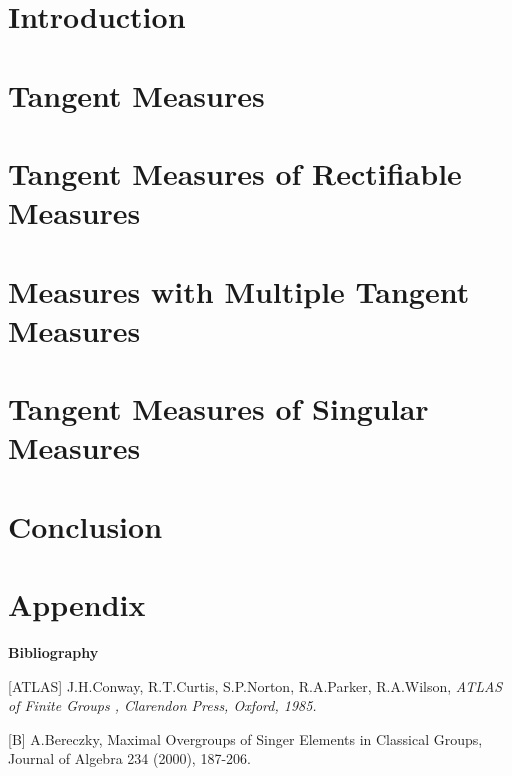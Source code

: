 \documentclass[11pt,a4paper,twoside]{article}
\begin{document}
 

\setcounter{page}{2}

\onehalfspacing
{}
\onehalfspacing
\raggedbottom

% 

\section{Introduction}


\section{Tangent Measures}


\section{Tangent Measures of Rectifiable Measures}


\section{Measures with Multiple Tangent Measures}


\section{Tangent Measures of Singular Measures}


\section{Conclusion}


\appendix
\section{Appendix}


\pagebreak

{\Huge \bf Bibliography}

\bigskip


%

[ATLAS] J.H.Conway, R.T.Curtis, S.P.Norton, R.A.Parker, R.A.Wilson, \it ATLAS of Finite Groups \rm, Clarendon Press, Oxford, 1985.

[B] A.Bereczky, Maximal Overgroups of Singer Elements in Classical Groups, Journal of Algebra 234 (2000), 187-206.
\end{document}
